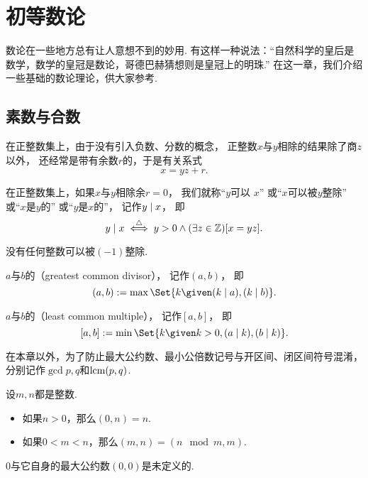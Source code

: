 \begingroup
\chapter{初等数论}
数论在一些地方总有让人意想不到的妙用.
有这样一种说法：“自然科学的皇后是数学，数学的皇冠是数论，哥德巴赫猜想则是皇冠上的明珠.”
在这一章，我们介绍一些基础的数论理论，供大家参考.

\section{素数与合数}
在正整数集上，由于没有引入负数、分数的概念，
正整数\(x\)与\(y\)相除的结果除了商\(z\)以外，
还经常是带有余数\(r\)的，于是有关系式\[
	x = y z + r.
\]

\begin{definition}
在正整数集上，如果\(x\)与\(y\)相除余\(r=0\)，
我们就称“\(y\)可以 \(x\)”
或“\(x\)可以被\(y\)整除”
或“\(x\)是\(y\)的”
或“\(y\)是\(x\)的”，
记作\(\truediv{x}{y}\)，
即\[
	\truediv{x}{y}
	\defiff
	y > 0
	\land
	(\exists z\in\mathbb{Z})
	[x = y z].
\]
\end{definition}

\begin{property}
没有任何整数可以被\((-1)\)整除.
\end{property}

\begin{definition}
\(a\)与\(b\)的（greatest common divisor），
记作\((a,b)\)，
即\[
	(a,b) \defeq \max\Set{ k \given (\truediv{a}{k}), (\truediv{b}{k}) }.
\]
\end{definition}
\begin{definition}
\(a\)与\(b\)的（least common multiple），
记作\([a,b]\)，
即\[
	[a,b] \defeq \min\Set{ k \given k>0, (\truediv{k}{a}), (\truediv{k}{b}) }.
\]
\end{definition}
在本章以外，为了防止最大公约数、最小公倍数记号与开区间、闭区间符号混淆，
分别记作\(\gcd{p,q}\)和\(\lcm{p,q}\).

\begin{property}
设\(m,n\)都是整数.
\begin{itemize}
	\item 如果\(n>0\)，那么\((0,n)=n\).
	\item 如果\(0<m<n\)，那么\((m,n) = (n \mod m,m)\).
\end{itemize}
\end{property}
\begin{remark}
\(0\)与它自身的最大公约数\((0,0)\)是未定义的.
\end{remark}

